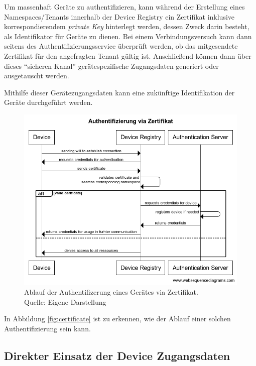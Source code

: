Um massenhaft Geräte zu authentifizieren, kann während der Erstellung eines Namespaces/Tenants innerhalb der Device Registry ein Zertifikat inklusive korrespondierendem \textit{private Key} hinterlegt werden, dessen Zweck darin besteht, als Identifikator für Geräte zu dienen. Bei einem Verbindungsversuch kann dann seitens des Authentifizierungsservice überprüft werden, ob das mitgesendete Zertifikat für den angefragten Tenant gültig ist. Anschließend können dann über dieses \enquote{sicheren Kanal} gerätespezifische Zugangsdaten generiert oder ausgetauscht werden.

Mithilfe dieser Gerätezugangsdaten kann eine zukünftige Identifikation der Geräte durchgeführt werden.

\begin{figure}[ht]
    \centering
    \includegraphics[width=1.0\linewidth]{img/device_authentication.png}
    \caption[Ablauf der Authentifizierung via Zertifikat]{Ablauf der Authentifizerung eines Gerätes via Zertifikat.\\ Quelle: Eigene Darstellung}
    \label{fig:certificate}
\end{figure}

In Abbildung \vref{fig:certificate} ist zu erkennen, wie der Ablauf einer solchen Authentifizierung sein kann.

\subsection{Direkter Einsatz der Device Zugangsdaten}
\label{sec:credentials}

